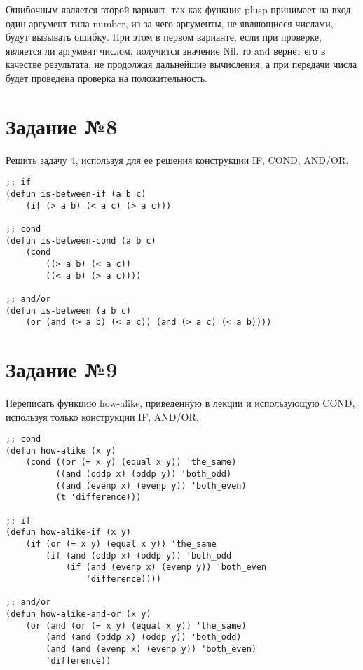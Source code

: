 Ошибочным является второй вариант, так как функция plusp принимает на вход один
аргумент типа number, из-за чего аргументы, не являющиеся числами, будут
вызывать ошибку. При этом в первом варианте, если при проверке, является ли
аргумент числом, получится значение Nil, то and вернет его в качестве
результата, не продолжая дальнейшие вычисления, а при передачи числа будет
проведена проверка на положительность.

\section{Задание №8}

Решить задачу 4, используя для ее решения конструкции IF, COND, AND/OR.

\vspace{4mm}
\begin{minipage}{0.92\linewidth}
\begin{lstlisting}
;; if
(defun is-between-if (a b c)
    (if (> a b) (< a c) (> a c)))

;; cond
(defun is-between-cond (a b c)
    (cond
        ((> a b) (< a c))
        ((< a b) (> a c))))

;; and/or
(defun is-between (a b c)
    (or (and (> a b) (< a c)) (and (> a c) (< a b))))
\end{lstlisting}
\end{minipage}

\section{Задание №9}

Переписать функцию how-alike, приведенную в лекции и использующую COND,
используя только конструкции IF, AND/OR.

\vspace{4mm}
\begin{minipage}{0.92\linewidth}
\begin{lstlisting}
;; cond
(defun how-alike (x y)
    (cond ((or (= x y) (equal x y)) 'the_same)
          ((and (oddp x) (oddp y)) 'both_odd)
          ((and (evenp x) (evenp y)) 'both_even)
          (t 'difference)))

;; if
(defun how-alike-if (x y)
    (if (or (= x y) (equal x y)) 'the_same
        (if (and (oddp x) (oddp y)) 'both_odd
            (if (and (evenp x) (evenp y)) 'both_even
                'difference))))

;; and/or
(defun how-alike-and-or (x y)
    (or (and (or (= x y) (equal x y)) 'the_same)
        (and (and (oddp x) (oddp y)) 'both_odd)
        (and (and (evenp x) (evenp y)) 'both_even)
        'difference))
\end{lstlisting}
\end{minipage}

